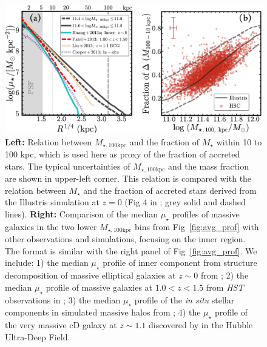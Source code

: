 \documentclass[a4paper,fleqn,usenatbib]{mnras}
\def\mstar{{$M_{\star}$}}
\def\mtot{{$M_{\star,100\mathrm{kpc}}$}}
\def\mden{{$\mu_{\star}$}}
\begin{document}
  \begin{figure}
      \centering 
      \includegraphics[width=\textwidth]{fig/redbcg_insitu_accretion}
      \caption{
          \textbf{Left:}
          Relation between \mtot{} and the fraction of \mstar{} within 10 to 100 kpc, 
          which is used here as proxy of the fraction of accreted stars. 
          The typical uncertainties of \mtot{} and the mass fraction are shown in 
          upper-left corner. 
          This relation is compared with the relation between \mstar{} and the fraction
          of accreted stars derived from the Illustris simulation at $z=0$ 
          (Fig 4 in \citealt{RodriguezGomez2016}; grey solid and dashed lines). 
          \textbf{Right:}
          Comparison of the median \mden{} profiles of massive galaxies in the 
          two lower \mtot{} bins from Fig~\ref{fig:avg_prof} with other observations 
          and simulations, focusing on the inner region. 
          The format is similar with the right panel of Fig~\ref{fig:avg_prof}.
          We include: 
          1) the median \mden{} profile of inner component from structure 
          decomposition of massive elliptical galaxies at $z{\sim} 0$ from 
          \citet[][Cyan, solid]{Huang2013a}; 
          2) the median \mden{} profile of massive galaxies at $1.0 < z < 1.5$ 
          from \textit{HST} observations in \citet[][Red, dashed]{Patel2013}; 
          3) the median \mden{} profile of the \textit{in situ} stellar components in 
          simulated massive halos from \citet[][Purple, dot-dashed]{Cooper2013};
          4) the \mden{} profile of the very massive cD galaxy at $z{\sim} 1.1$ 
          discovered by \citet[][Yellow, dashed]{Liu2013} in the Hubble 
          Ultra-Deep Field.
          }
      \label{fig:discussion_1}
  \end{figure}
\end{document}
